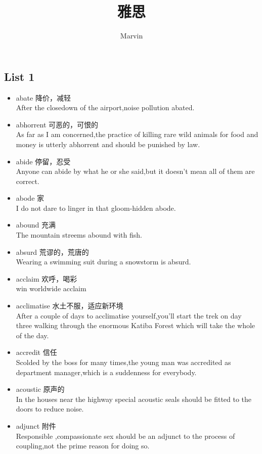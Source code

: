 \documentclass[a4paper,10pt]{article}
\title{雅思}
\author{Marvin}
\date{}
\begin{document}
\begin{CJK*}{UTF8}{gkai}

\newpage
\section{List 1}
\begin{itemize}
\item abate   降价，减轻\\
\hspace{1cm}After the closedown of the airport,noise pollution abated.
\item abhorrent 可恶的，可恨的\\
\hspace{1cm}As far as I am concerned,the practice of killing rare wild animals for food and money is utterly abhorrent and should be punished by law.
\item abide 停留，忍受\\
\hspace{1cm}Anyone can abide by what he or she said,but it doesn't mean all of them are correct.
\item abode 家\\
\hspace{1cm}I do not dare to linger in that gloom-hidden abode.
\item abound  充满\\
\hspace{1cm}The mountain streems abound with fish.
\item absurd 荒谬的，荒唐的\\
\hspace{1cm}Wearing a swimming suit during a snowstorm is absurd.
\item acclaim  欢呼，喝彩\\
\hspace{1cm}win worldwide acclaim
\item acclimatise 水土不服，适应新环境\\
\hspace{1cm}After a couple of days to acclimatise yourself,you'll start the trek on day three walking through the enormous Katiba Forest which will take the whole of the day.
\item accredit 信任\\
\hspace{1cm}Scolded by the boss for many times,the young man was accredited as department manager,which is a suddenness for everybody.
\item acoustic 原声的\\
\hspace{1cm}In the houses near the highway special acoustic seals should be fitted to the doors to reduce noise.
\item adjunct 附件\\
\hspace{1cm}Responsible ,compassionate sex should be an adjunct to the process of coupling,not the prime reason for doing so.
\end{itemize}



\end{CJK*}
\end{document}
